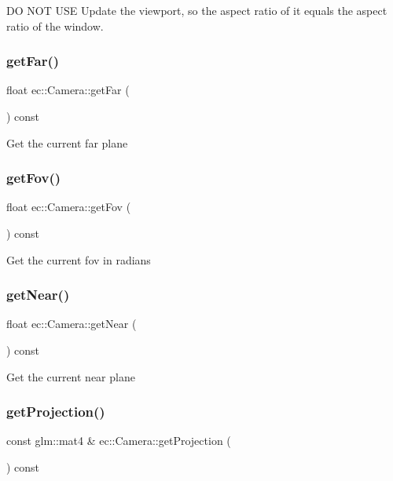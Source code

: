 DO N\+OT U\+SE Update the viewport, so the aspect ratio of it equals the aspect ratio of the window. \mbox{\label{classec_1_1_camera_a6555d47e1c17caf67cf8683b4cbaca4b}} 
\subsubsection{\texorpdfstring{get\+Far()}{getFar()}}
{\footnotesize\ttfamily float ec\+::\+Camera\+::get\+Far (\begin{DoxyParamCaption}{ }\end{DoxyParamCaption}) const}

Get the current far plane \mbox{\label{classec_1_1_camera_a741cb88974dfd00492315ccf613e8539}} 
\subsubsection{\texorpdfstring{get\+Fov()}{getFov()}}
{\footnotesize\ttfamily float ec\+::\+Camera\+::get\+Fov (\begin{DoxyParamCaption}{ }\end{DoxyParamCaption}) const}

Get the current fov in radians \mbox{\label{classec_1_1_camera_a02786d8adecb275e6182cf166b65edb4}} 
\subsubsection{\texorpdfstring{get\+Near()}{getNear()}}
{\footnotesize\ttfamily float ec\+::\+Camera\+::get\+Near (\begin{DoxyParamCaption}{ }\end{DoxyParamCaption}) const}

Get the current near plane \mbox{\label{classec_1_1_camera_a5c245ceac5e710447b88a26a66dcc348}} 
\subsubsection{\texorpdfstring{get\+Projection()}{getProjection()}}
{\footnotesize\ttfamily const glm\+::mat4 \& ec\+::\+Camera\+::get\+Projection (\begin{DoxyParamCaption}{ }\end{DoxyParamCaption}) const}

